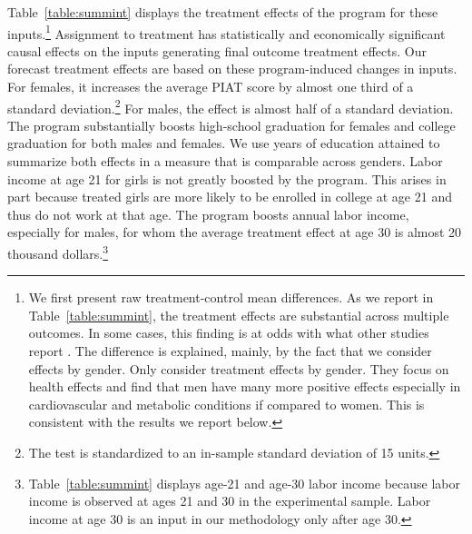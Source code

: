 Table~\ref{table:summint} displays the treatment effects of the program for these inputs.\footnote{We first present raw treatment-control mean differences. As we report in Table~\ref{table:summint}, the treatment effects are substantial across multiple outcomes. In some cases, this finding is at odds with what other studies report \citep{Ramey_etal_1985_Project-CARE_TiECSE,Clarke_Campbell_1998_ABC_Comparison_ECRQ,Campbell_Pungello_etal_2001_DP,Campbell_Ramey_etal_2002_ADS,Campbell_Wasik_etal_2008_ECRQ,Campbell_Conti_etal_2014_EarlyChildhoodInvestments}. The difference is explained, mainly, by the fact that we consider effects by gender.  Only \citet{Campbell_Conti_etal_2014_EarlyChildhoodInvestments} consider treatment effects by gender. They focus on health effects and find that men have many more positive effects especially in cardiovascular and metabolic conditions if compared to women. This is consistent with the results we report below.} Assignment to treatment has statistically and economically significant causal effects on the inputs generating final outcome treatment effects. Our forecast treatment effects are based on these program-induced changes in inputs. For females, it increases the average PIAT score by almost one third of a standard deviation.\footnote{The test is standardized to an in-sample standard deviation of 15 units.} For males, the effect is almost half of a standard deviation. The program substantially boosts high-school graduation for females and college graduation for both males and females. We use years of education attained to summarize both effects in a measure that is comparable across genders. Labor income at age 21 for girls is not greatly boosted by the program. This arises in part because treated girls are more likely to be enrolled in college at age 21 and thus do not work at that age. The program boosts annual labor income, especially for males, for whom the average treatment effect at age 30 is almost 20 thousand dollars.\footnote{Table~\ref{table:summint} displays age-21 and age-30 labor income because labor income is observed at ages 21 and 30 in the experimental sample. Labor income at age 30 is an input in our methodology only after age 30.}

